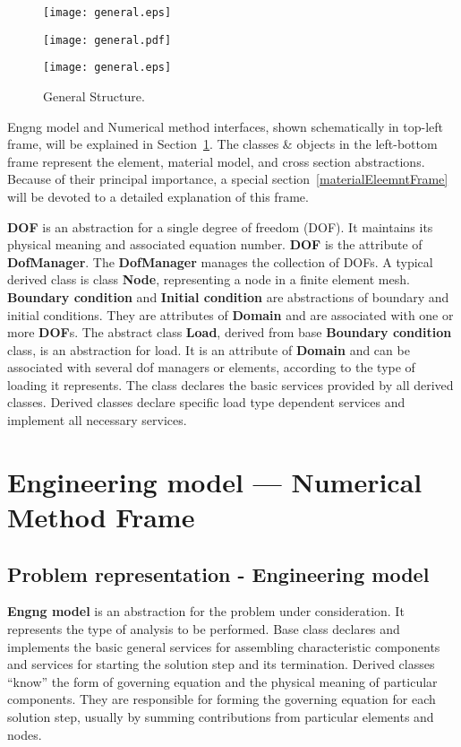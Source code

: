 \documentclass[a4paper]{article}
\newcommand{\class}[1]{{\bf #1}}
\begin{document}
\begin{figure}[tb]
\begin{htmlonly}
  \centerline{\texttt{[image: general.eps]}}
\end{htmlonly}
\ifpdf
\centerline{\texttt{[image: general.pdf]}}
\else
\centerline{\texttt{[image: general.eps]}}
\fi
\caption{General Structure.}
\label{genstructfig}
\end{figure}

Engng model and Numerical method interfaces, shown schematically in
top-left frame, will be explained in
Section~\ref{engngNummetsection}. The classes \& objects in the left-bottom frame represent the element,
material model, and cross section abstractions. Because of their
principal importance, a special 
section~\ref{materialEleemntFrame} will be devoted to a detailed
explanation of this frame. 

\class{DOF} is an abstraction for a single degree of freedom (DOF). It maintains
its physical meaning and associated equation number. \class{DOF} is
the attribute of \class{DofManager}. The \class{DofManager} manages the collection
of DOFs. A typical
derived class is class \class{Node}, representing a node in a finite element mesh.
\class{Boundary condition} and \class{Initial condition} are abstractions of boundary and
initial conditions. They are attributes of \class{Domain} and are associated
with one or more \class{DOF}s. The abstract class \class{Load}, derived from base \class{Boundary
condition} class, is an abstraction for load. It is an attribute of \class{Domain}
and can be associated with several dof managers or elements, according to
the type of loading it represents. The class declares the basic services provided by
all derived classes. Derived classes declare specific load type dependent
services and implement all necessary services.



\section {Engineering model --- Numerical Method Frame}
\label{engngNummetsection}

\subsection{Problem representation - Engineering model}
\class{Engng model} is an abstraction for the problem under
consideration. It represents the type of analysis to be performed.
Base class declares and implements the basic general services for assembling
characteristic components and services for starting the solution step and
its termination. Derived classes ``know'' the form of governing
equation and the physical meaning of  particular components. 
They are responsible for forming the governing equation for each solution
step,  usually by summing contributions from particular elements and
nodes.
\end{document}
